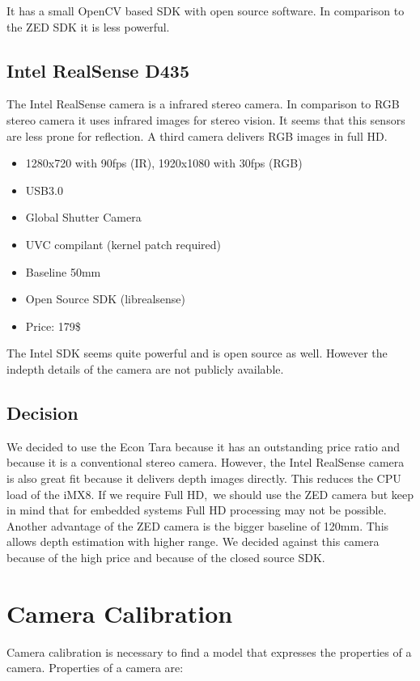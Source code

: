 \documentclass[11pt,a4paper,titlepage,oneside]{report}
\begin{document}
It has a small OpenCV based SDK with open source software. In comparison to the ZED SDK it is less powerful.

\section{Intel RealSense D435}
The Intel RealSense camera \cite{realsense} is a infrared stereo camera. In comparison to RGB stereo camera it uses infrared images for stereo vision. It seems that this sensors are less prone for reflection. A third camera delivers RGB images in full HD.
\begin{itemize}
	\item 1280x720 with 90fps (IR), 1920x1080 with 30fps (RGB)
	\item USB3.0
	\item Global Shutter Camera
	\item UVC compilant (kernel patch required)
	\item Baseline 50mm
	\item Open Source SDK (librealsense)
	\item Price: 179\$
\end{itemize}

The Intel SDK seems quite powerful and is open source as well. However the indepth details of the camera are not publicly available.

\section{Decision}

We decided to use the Econ Tara because it has an outstanding price ratio and because it is a conventional stereo camera. However, the Intel RealSense camera is also great fit because it delivers depth images directly. This reduces the CPU load of the iMX8. If we require Full HD, we should use the ZED camera but keep in mind that for embedded systems Full HD processing may not be possible. Another advantage of the ZED camera is the bigger baseline of 120mm. This allows depth estimation with higher range. We decided against this camera because of the high price and because of the closed source SDK.

\chapter{Camera Calibration}

Camera calibration is necessary to find a model that expresses the properties of a camera. Properties of a camera are:
\end{document}
